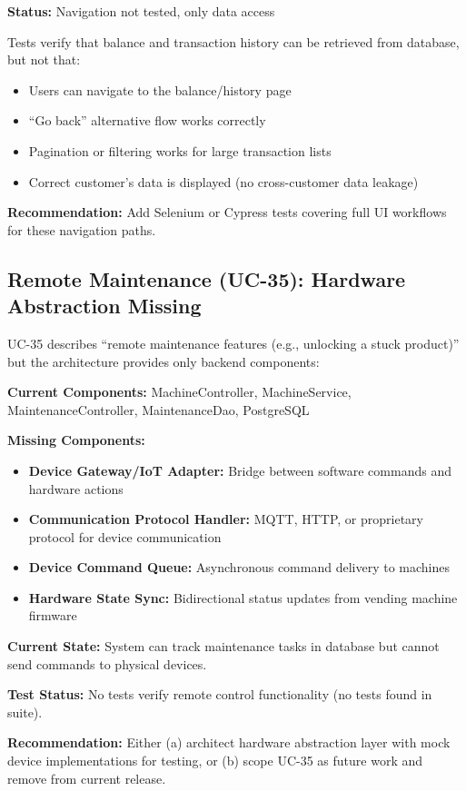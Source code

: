 \documentclass[11pt,a4paper]{article}
\begin{document}
\begin{tcolorbox}[colback=warningorange!5,colframe=warningorange,title=\textbf{UC-28, UC-29: Balance and Transaction History Viewing}]
\textbf{Status:} Navigation not tested, only data access

Tests verify that balance and transaction history can be retrieved from database, but not that:
\begin{itemize}
    \item Users can navigate to the balance/history page
    \item ``Go back'' alternative flow works correctly
    \item Pagination or filtering works for large transaction lists
    \item Correct customer's data is displayed (no cross-customer data leakage)
\end{itemize}

\textbf{Recommendation:} Add Selenium or Cypress tests covering full UI workflows for these navigation paths.
\end{tcolorbox}

\subsection{Remote Maintenance (UC-35): Hardware Abstraction Missing}

UC-35 describes ``remote maintenance features (e.g., unlocking a stuck product)'' but the architecture provides only backend components:

\begin{tcolorbox}[colback=criticalred!5,colframe=criticalred,title=\textbf{UC-35 Implementation Gap}]
\textbf{Current Components:} MachineController, MachineService, MaintenanceController, MaintenanceDao, PostgreSQL

\textbf{Missing Components:}
\begin{itemize}
    \item \textbf{Device Gateway/IoT Adapter:} Bridge between software commands and hardware actions
    \item \textbf{Communication Protocol Handler:} MQTT, HTTP, or proprietary protocol for device communication
    \item \textbf{Device Command Queue:} Asynchronous command delivery to machines
    \item \textbf{Hardware State Sync:} Bidirectional status updates from vending machine firmware
\end{itemize}

\textbf{Current State:} System can track maintenance tasks in database but cannot send commands to physical devices.

\textbf{Test Status:} No tests verify remote control functionality (no tests found in suite).

\textbf{Recommendation:} Either (a) architect hardware abstraction layer with mock device implementations for testing, or (b) scope UC-35 as future work and remove from current release.
\end{tcolorbox}
\end{document}
